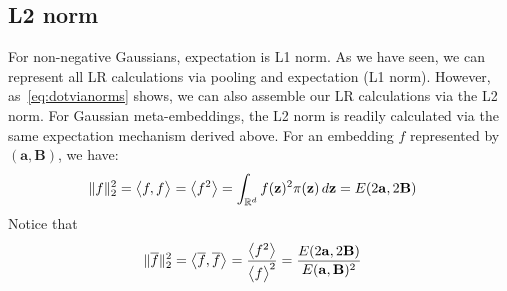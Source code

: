 \documentclass[a4paper,oneside,12pt,english]{report}
\def\zvec{\mathbf{z}}
\def\expv#1#2{\bigl\langle#1\bigr\rangle_{#2}}
\def\expp#1{\bigl\langle#1\bigr\rangle}
\def\R{\mathbb{R}}
\def\Bmat{\mathbf{B}}
\def\Imat{\mathbf{I}}
\def\avec{\mathbf{a}}
\def\dot#1#2{\expv{#1,#2}{}}
\def\normal#1{\overline{#1}}
\def\dotn#1#2{\dot{\normal{#1}}{\normal{#2}}}
\begin{document}
\subsection{L2 norm}
For non-negative Gaussians, expectation is L1 norm. As we have seen, we can represent all LR calculations via pooling and expectation (L1 norm). However, as~\eqref{eq:dotvianorms} shows, we can also assemble our LR calculations via the L2 norm. For Gaussian meta-embeddings, the L2 norm is readily calculated via the same expectation mechanism derived above. For an embedding $f$ represented by $(\avec,\Bmat)$, we have:
\begin{align}
\norm{f}^2 &= \dot{f}{f} = \expp{f^2} = \int_{\R^d}f(\zvec)^2\pi(\zvec)\,d\zvec = E(2\avec,2\Bmat)
\end{align}  
Notice that 
\begin{align}
\norm{\normal{f}}^2 &= \dotn{f}{f} = \frac{\expp{f^2}}{\expp{f}^2} = \frac{E(2\avec,2\Bmat)}{E(\avec,\Bmat)^2}
\end{align}  




\end{document}
